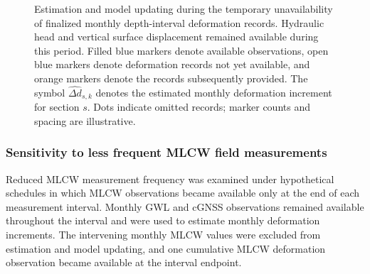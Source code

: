 \begin{figure}[htbp]
{%
  }
  \caption{Estimation and model updating during the temporary unavailability of finalized monthly depth-interval deformation records. Hydraulic head and vertical surface displacement remained available during this period. Filled blue markers denote available observations, open blue markers denote deformation records not yet available, and orange markers denote the records subsequently provided. The symbol $\widehat{\Delta d}_{s,k}$ denotes the estimated monthly deformation increment for section $s$. Dots indicate omitted records; marker counts and spacing are illustrative.}
  \label{fig:delayed_observation_design}
\end{figure}

\subsubsection{Sensitivity to less frequent MLCW field measurements}
\label{subsec:sparse_measurement_sensitivity}

Reduced MLCW measurement frequency was examined under hypothetical schedules in which MLCW observations became available only at the end of each measurement interval. Monthly GWL and cGNSS observations remained available throughout the interval and were used to estimate monthly deformation increments. The intervening monthly MLCW values were excluded from estimation and model updating, and one cumulative MLCW deformation observation became available at the interval endpoint.

